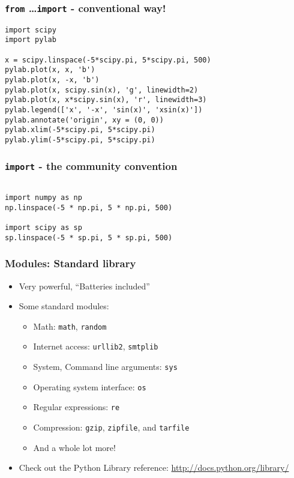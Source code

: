 \documentclass[14pt,compress]{beamer}
\newcounter{time}
\newcommand{\inctime}[1]{\addtocounter{time}{#1}{\tiny \thetime\ m}}
\newcommand{\typ}[1]{\lstinline{#1}}
\begin{document}
\begin{frame}[fragile]
  \frametitle{\texttt{from} \ldots \texttt{import} - conventional way!}
  \small
  \begin{lstlisting}
import scipy
import pylab

x = scipy.linspace(-5*scipy.pi, 5*scipy.pi, 500)
pylab.plot(x, x, 'b')
pylab.plot(x, -x, 'b')
pylab.plot(x, scipy.sin(x), 'g', linewidth=2)
pylab.plot(x, x*scipy.sin(x), 'r', linewidth=3)
pylab.legend(['x', '-x', 'sin(x)', 'xsin(x)'])
pylab.annotate('origin', xy = (0, 0))
pylab.xlim(-5*scipy.pi, 5*scipy.pi)
pylab.ylim(-5*scipy.pi, 5*scipy.pi)
  \end{lstlisting}
\end{frame}

\begin{frame}[fragile]
  \frametitle{\texttt{import} - the community convention}
  \begin{lstlisting}

import numpy as np
np.linspace(-5 * np.pi, 5 * np.pi, 500)

import scipy as sp
sp.linspace(-5 * sp.pi, 5 * sp.pi, 500)

  \end{lstlisting}
\end{frame}

\begin{frame}
  \frametitle{Modules: Standard library}
  \begin{itemize}
  \item Very powerful, ``Batteries included''
  \item Some standard modules:
    \begin{itemize}
    \item Math: \typ{math}, \typ{random}
    \item Internet access: \typ{urllib2}, \typ{smtplib}
    \item System, Command line arguments: \typ{sys}
    \item Operating system interface: \typ{os}
    \item Regular expressions: \typ{re}
    \item Compression: \typ{gzip}, \typ{zipfile}, and \typ{tarfile}
    \item And a whole lot more!
    \end{itemize}
  \item Check out the Python Library reference:
    \url{http://docs.python.org/library/}
  \end{itemize}
\inctime{5}
\end{frame}
\end{document}
